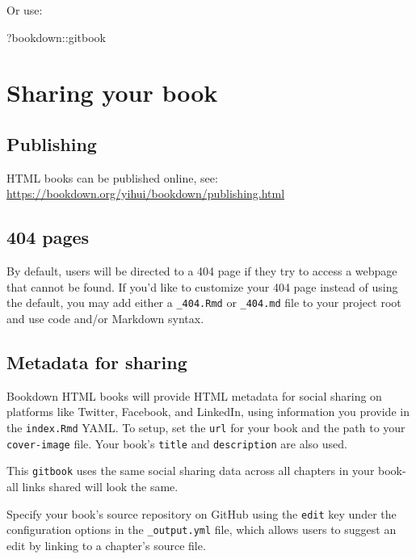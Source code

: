 \documentclass[
]{book}
\newenvironment{Shaded}{\begin{snugshade}}{\end{snugshade}}
\newcommand{\NormalTok}[1]{#1}
\newcommand{\SpecialCharTok}[1]{\textcolor[rgb]{0.00,0.00,0.00}{#1}}
\theoremstyle{definition}
\theoremstyle{definition}
\theoremstyle{definition}
\theoremstyle{definition}
\theoremstyle{remark}
\begin{document}
Or use:

\begin{Shaded}
\begin{Highlighting}[]
\NormalTok{?bookdown}\SpecialCharTok{::}\NormalTok{gitbook}
\end{Highlighting}
\end{Shaded}

\hypertarget{sharing-your-book-4}{%
\chapter{Sharing your book}\label{sharing-your-book-4}}

\hypertarget{publishing-6}{%
\section{Publishing}\label{publishing-6}}

HTML books can be published online, see: \url{https://bookdown.org/yihui/bookdown/publishing.html}

\hypertarget{pages-6}{%
\section{404 pages}\label{pages-6}}

By default, users will be directed to a 404 page if they try to access a webpage that cannot be found. If you'd like to customize your 404 page instead of using the default, you may add either a \texttt{\_404.Rmd} or \texttt{\_404.md} file to your project root and use code and/or Markdown syntax.

\hypertarget{metadata-for-sharing-6}{%
\section{Metadata for sharing}\label{metadata-for-sharing-6}}

Bookdown HTML books will provide HTML metadata for social sharing on platforms like Twitter, Facebook, and LinkedIn, using information you provide in the \texttt{index.Rmd} YAML. To setup, set the \texttt{url} for your book and the path to your \texttt{cover-image} file. Your book's \texttt{title} and \texttt{description} are also used.

This \texttt{gitbook} uses the same social sharing data across all chapters in your book- all links shared will look the same.

Specify your book's source repository on GitHub using the \texttt{edit} key under the configuration options in the \texttt{\_output.yml} file, which allows users to suggest an edit by linking to a chapter's source file.
\end{document}

